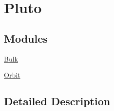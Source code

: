 \hypertarget{group___e_g_x_phys-_constants-_astrophysics-_solar_system-_pluto}{}\section{Pluto}
\label{group___e_g_x_phys-_constants-_astrophysics-_solar_system-_pluto}
\subsection*{Modules}
\begin{DoxyCompactItemize}
\item 
\mbox{\hyperlink{group___e_g_x_phys-_constants-_astrophysics-_solar_system-_pluto-_bulk}{Bulk}}
\item 
\mbox{\hyperlink{group___e_g_x_phys-_constants-_astrophysics-_solar_system-_pluto-_orbit}{Orbit}}
\end{DoxyCompactItemize}


\subsection{Detailed Description}
